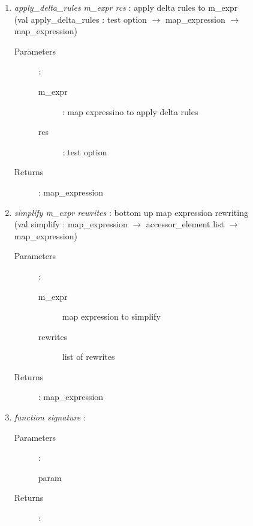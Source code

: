 \documentclass{article}
\begin{document}
\begin{enumerate}
  \item \emph{apply\_delta\_rules m\_expr rcs} : apply delta rules to m\_expr\\
  (val apply\_delta\_rules : test option $\rightarrow$ map\_expression $\rightarrow$ map\_expression)
      \begin{description}
      \item[Parameters] :
        \begin{description}
          \item[m\_expr] : map expressino to apply delta rules
          \item[rcs] : test option 
        \end{description}
      \item[Returns] : map\_expression
    \end{description}

  \item \emph{simplify m\_expr rewrites} : bottom up map expression rewriting\\
  (val simplify : map\_expression $\rightarrow$ accessor\_element list $\rightarrow$ map\_expression)
      \begin{description}
      \item[Parameters] :
        \begin{description}
          \item[m\_expr] map expression to simplify 
          \item[rewrites] list of rewrites 
        \end{description}
      \item[Returns] : map\_expression
    \end{description}

  \item \emph{function signature} : 
      \begin{description}
      \item[Parameters] :
        \begin{description}
          \item[param] 
        \end{description}
      \item[Returns] : 
    \end{description}

\end{enumerate}



\pagebreak
\end{document}

